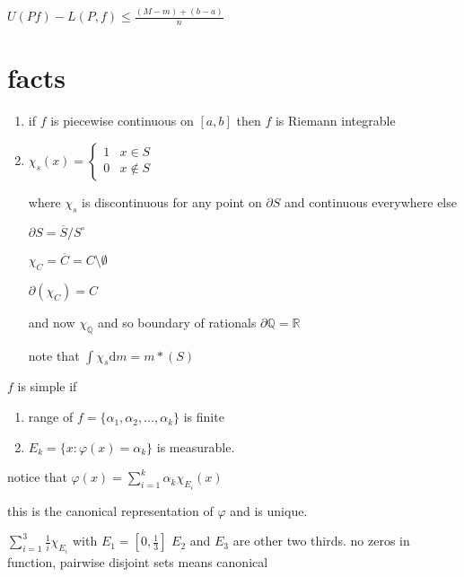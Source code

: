 \documentclass[letterpaper]{article}
\begin{document}
$U(Pf)-L(P,f)\le \frac{(M-m)+(b-a)}{n}$

\section*{facts}
\begin{enumerate}
\item
if $f$ is piecewise continuous on $[a,b]$ then $f$ is Riemann integrable
\item
$\chi_s(x)=\begin{cases}1&x\in S\\0&x\not\in S\end{cases}$

where $\chi_s$ is discontinuous for any point on $\partial S$ and continuous everywhere else

$\partial S=\overline{S}/S^\circ$

$\chi_C=\overline{C}=C\setminus\emptyset$

$\partial (\chi_C)=C$

and now $\chi_{\mathbb{Q}}$ and so boundary of rationals $\partial \mathbb{Q}=\mathbb{R}$

note that $\int{\chi_s\mathrm{d}m}=m*(S)$
\end{enumerate}


$f$ is simple if
\begin{enumerate}
\item
range of $f=\{\alpha_1,\alpha_2,\dots,\alpha_k\}$ is finite
\item
$E_k=\{x:\varphi(x)=\alpha_k\}$ is measurable.

\end{enumerate}

notice that $\varphi(x)=\sum\limits_{i=1}^k{\alpha_k\chi_{E_i}(x)}$

this is the canonical representation of $\varphi$ and is unique.

$\sum\limits_{i=1}^3{\frac{1}{i}\chi_{E_i}}$ with $E_1=[0,\frac{1}{3}]$ $E_2$ and $E_3$ are other two thirds. no zeros in function, pairwise disjoint sets means canonical
\end{document}
